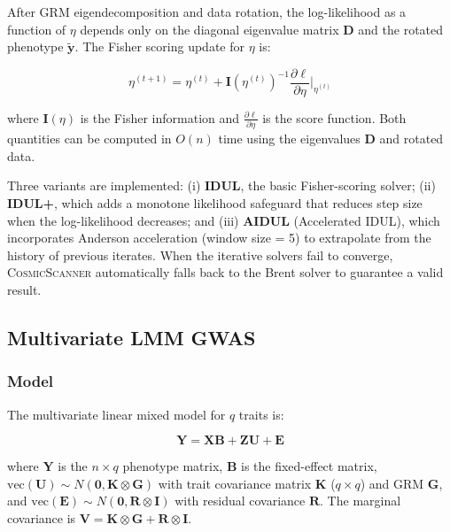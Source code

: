 \documentclass[11pt,a4paper]{article}
\newcommand{\CosmicScanner}{\textsc{CosmicScanner}}
\begin{document}
After GRM eigendecomposition and data rotation, the log-likelihood as a function of $\eta$ depends only on the diagonal eigenvalue matrix $\mathbf{D}$ and the rotated phenotype $\tilde{\mathbf{y}}$. The Fisher scoring update for $\eta$ is:

\begin{equation}
\eta^{(t+1)} = \eta^{(t)} + \mathbf{I}(\eta^{(t)})^{-1} \frac{\partial \ell}{\partial \eta}\bigg|_{\eta^{(t)}}
\label{eq:idul}
\end{equation}

where $\mathbf{I}(\eta)$ is the Fisher information and $\frac{\partial \ell}{\partial \eta}$ is the score function. Both quantities can be computed in $O(n)$ time using the eigenvalues $\mathbf{D}$ and rotated data.

Three variants are implemented: (i) \textbf{IDUL}, the basic Fisher-scoring solver; (ii) \textbf{IDUL+}, which adds a monotone likelihood safeguard that reduces step size when the log-likelihood decreases; and (iii) \textbf{AIDUL} (Accelerated IDUL), which incorporates Anderson acceleration (window size = 5) to extrapolate from the history of previous iterates. When the iterative solvers fail to converge, \CosmicScanner{} automatically falls back to the Brent solver to guarantee a valid result.

\subsection{Multivariate LMM GWAS}

\subsubsection{Model}

The multivariate linear mixed model for $q$ traits is:

\begin{equation}
\mathbf{Y} = \mathbf{X}\mathbf{B} + \mathbf{Z}\mathbf{U} + \mathbf{E}
\label{eq:mlmm}
\end{equation}

where $\mathbf{Y}$ is the $n \times q$ phenotype matrix, $\mathbf{B}$ is the fixed-effect matrix, $\text{vec}(\mathbf{U}) \sim N(\mathbf{0}, \mathbf{K} \otimes \mathbf{G})$ with trait covariance matrix $\mathbf{K}$ ($q \times q$) and GRM $\mathbf{G}$, and $\text{vec}(\mathbf{E}) \sim N(\mathbf{0}, \mathbf{R} \otimes \mathbf{I})$ with residual covariance $\mathbf{R}$. The marginal covariance is $\mathbf{V} = \mathbf{K} \otimes \mathbf{G} + \mathbf{R} \otimes \mathbf{I}$.
\end{document}

